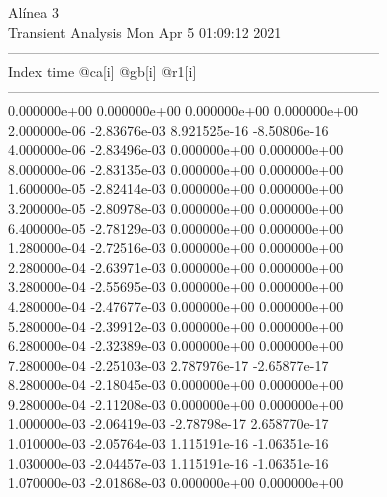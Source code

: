                                    Alínea 3 \\ \hline
                                   Transient Analysis  Mon Apr  5 01:09:12  2021\\ \hline
--------------------------------------------------------------------------------\\ \hline
Index   time            @ca[i]          @gb[i]          @r1[i]          \\ \hline
--------------------------------------------------------------------------------\\ 	0.000000e+00	0.000000e+00	0.000000e+00	0.000000e+00	\\ 	2.000000e-06	-2.83676e-03	8.921525e-16	-8.50806e-16	\\ 	4.000000e-06	-2.83496e-03	0.000000e+00	0.000000e+00	\\ 	8.000000e-06	-2.83135e-03	0.000000e+00	0.000000e+00	\\ 	1.600000e-05	-2.82414e-03	0.000000e+00	0.000000e+00	\\ 	3.200000e-05	-2.80978e-03	0.000000e+00	0.000000e+00	\\ 	6.400000e-05	-2.78129e-03	0.000000e+00	0.000000e+00	\\ 	1.280000e-04	-2.72516e-03	0.000000e+00	0.000000e+00	\\ 	2.280000e-04	-2.63971e-03	0.000000e+00	0.000000e+00	\\ 	3.280000e-04	-2.55695e-03	0.000000e+00	0.000000e+00	\\ 	4.280000e-04	-2.47677e-03	0.000000e+00	0.000000e+00	\\ 	5.280000e-04	-2.39912e-03	0.000000e+00	0.000000e+00	\\ 	6.280000e-04	-2.32389e-03	0.000000e+00	0.000000e+00	\\ 	7.280000e-04	-2.25103e-03	2.787976e-17	-2.65877e-17	\\ 	8.280000e-04	-2.18045e-03	0.000000e+00	0.000000e+00	\\ 	9.280000e-04	-2.11208e-03	0.000000e+00	0.000000e+00	\\ 	1.000000e-03	-2.06419e-03	-2.78798e-17	2.658770e-17	\\ 	1.010000e-03	-2.05764e-03	1.115191e-16	-1.06351e-16	\\ 	1.030000e-03	-2.04457e-03	1.115191e-16	-1.06351e-16	\\ 	1.070000e-03	-2.01868e-03	0.000000e+00	0.000000e+00	\\ \hline
